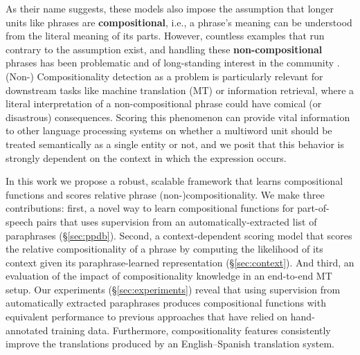 \documentclass[11pt,letterpaper]{article}
\begin{document}
As their name suggests, these models also impose the assumption that longer units like phrases are \textbf{compositional}, i.e., a phrase's meaning can be understood from the literal meaning of its parts. 
However, countless examples that run contrary to the assumption exist, and handling these \textbf{non-compositional} phrases has been problematic and of long-standing interest in the community \cite{Lin1999,Sag2002}.
(Non-) Compositionality detection as a problem is particularly relevant for downstream tasks like machine translation (MT) or information retrieval, where a literal interpretation of a non-compositional phrase could have comical (or disastrous) consequences. 
Scoring this phenomenon can provide vital information to other language processing systems on whether a multiword unit should be treated semantically as a single entity or not, and we posit that this behavior is strongly dependent on the context in which the expression occurs. 


In this work we propose a robust, scalable framework that learns compositional functions and scores relative phrase (non-)compositionality.
We make three contributions: first, a novel way to learn compositional functions for part-of-speech pairs that uses supervision from an automatically-extracted list of paraphrases (\S\ref{sec:ppdb}). 
Second, a context-dependent scoring model that scores the relative compositionality of a phrase \cite{McCarthy2003} by computing the likelihood of its context given its paraphrase-learned representation (\S\ref{sec:context}). 
And third, an evaluation of the impact of compositionality knowledge in an end-to-end MT setup.
Our experiments (\S\ref{sec:experiments}) reveal that using supervision from automatically extracted paraphrases produces compositional functions with equivalent performance to previous approaches that have relied on hand-annotated training data. Furthermore, compositionality features consistently improve the translations produced by an English--Spanish translation system.
\end{document}
